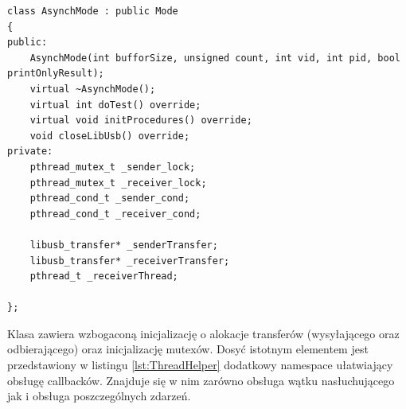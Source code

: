 \documentclass{BscUS}
\begin{document}
\begin{lstlisting}[caption={Deklaracja klasy SynchMode},label={lst:CAsynchMode}]
class AsynchMode : public Mode
{
public:
	AsynchMode(int bufforSize, unsigned count, int vid, int pid, bool printOnlyResult);
	virtual ~AsynchMode();
	virtual int doTest() override;
	virtual void initProcedures() override;
	void closeLibUsb() override;
private:
	pthread_mutex_t _sender_lock;
	pthread_mutex_t _receiver_lock;
	pthread_cond_t _sender_cond;
	pthread_cond_t _receiver_cond;

	libusb_transfer* _senderTransfer;
	libusb_transfer* _receiverTransfer;
	pthread_t _receiverThread;

};
\end{lstlisting}
Klasa zawiera wzbogaconą inicjalizację o alokacje transferów (wysyłającego oraz odbierającego) oraz inicjalizację mutexów.
\newline
Dosyć istotnym elementem jest przedstawiony w listingu \ref{lst:ThreadHelper} dodatkowy namespace ułatwiający obsługę callbacków. Znajduje się w nim zarówno obsługa wątku nasłuchującego jak i obsługa poszczególnych zdarzeń.
\end{document}
